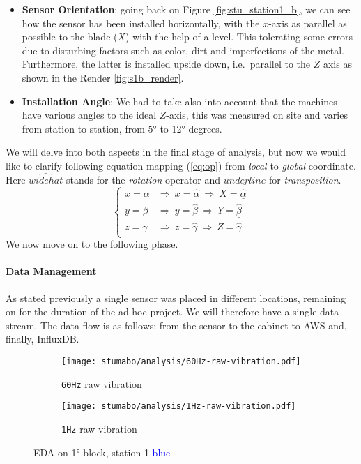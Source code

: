 \begin{itemize}
    \item \textbf{Sensor Orientation}: 
    going back on Figure \ref{fig:stu_station1_b}, we can see how the sensor has been installed horizontally, with the $x$-axis as parallel as possible to the blade ($X$) with 
    the help of a level. 
    This tolerating some errors due to disturbing factors such as color, dirt and imperfections of the metal.
    Furthermore, the latter is installed upside down, i.e.\ parallel to the $Z$ axis as shown in the Render \ref{fig:s1b_render}.
    \item \textbf{Installation Angle}:
    We had to take also into account that the machines have various angles to the ideal $Z$-axis, this was measured on site and varies from station to station, from 5° to 12° degrees.
\end{itemize}
We will delve into both aspects in the final stage of analysis, but now we would like to clarify following equation-mapping (\ref{eq:op}) from \textit{local} to \textit{global} coordinate.
Here $\widehat{widehat}$ stands for the \textit{rotation} operator and $\underline{underline}$ for \textit{transposition}. 
\begin{equation}
    \left\{ \begin{array}{cl}
        x = \alpha & \Rightarrow  \ x = \widehat{\alpha} \ \Rightarrow  \ X = \underline{\widehat{\alpha}} \\
        y = \beta & \Rightarrow  \ y = \widehat{\beta} \ \Rightarrow  \ Y = \underline{\widehat{\beta}} \\ 
        z = \gamma & \Rightarrow  \ z = \widehat{\gamma} \ \Rightarrow  \ Z = \underline{\widehat{\gamma}}
        \end{array} \right.
    \label{eq:op}
\end{equation}
We now move on to the following phase.

\paragraph{Data Management}
As stated previously a single sensor was placed in different locations, remaining on for the duration of the ad hoc project. We will therefore have a single data stream.
The data flow is as follows: from the sensor to the cabinet to AWS and, finally, InfluxDB.
\begin{figure}[ht]
    \begin{subfigure}{.495\textwidth}
        \texttt{[image: stumabo/analysis/60Hz-raw-vibration.pdf]}
        \caption{\texttt{60Hz} raw vibration}
        \label{fig:stu_60Hz_raw}
    \end{subfigure}
    \begin{subfigure}{.495\textwidth}
        \texttt{[image: stumabo/analysis/1Hz-raw-vibration.pdf]}
        \caption{\texttt{1Hz} raw vibration}
        \label{fig:stu_1Hz_raw}
    \end{subfigure}
    \caption{\acl{EDA} on 1° block, station 1 \textcolor{blue}{blue}}
    \label{fig:stu_2_raw_data}
\end{figure}

